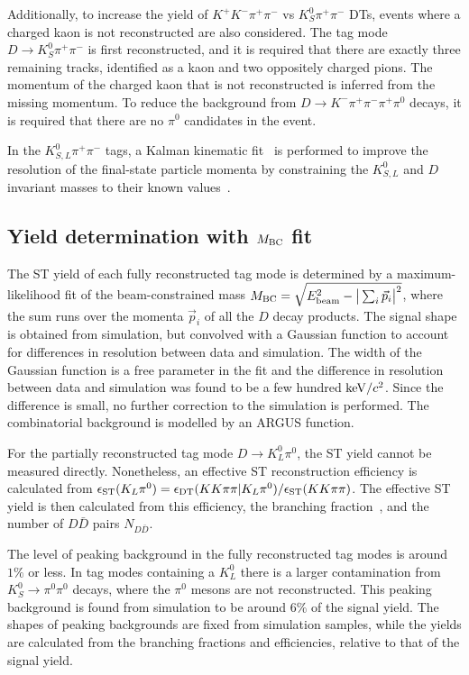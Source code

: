 \documentclass[12pt, a4paper, notitlepage, onecolumn]{article}
\begin{document}
Additionally, to increase the yield of $K^+K^-\pi^+\pi^-$ vs $K_S^0\pi^+\pi^-$ DTs, events where a charged kaon is not reconstructed are also considered. The tag mode $D\to K_S^0\pi^+\pi^-$ is first reconstructed, and it is required that there are exactly three remaining tracks, identified as a kaon and two oppositely charged pions. The momentum of the charged kaon that is not reconstructed is inferred from the missing momentum. To reduce the background from $D\to K^-\pi^+\pi^-\pi^+\pi^0$ decays, it is required that there are no $\pi^0$ candidates in the event.

In the $K_{S, L}^0\pi^+\pi^-$ tags, a Kalman kinematic fit~\cite{KalmanFit_cite} is performed to improve the resolution of the final-state particle momenta by constraining the $K_{S, L}^0$ and $D$ invariant masses to their known values~\cite{pdg}.

\subsection{Yield determination with \texorpdfstring{$M_{\rm BC}$}{MBC} fit}
\noindent The ST yield of each fully reconstructed tag mode is determined by a maximum-likelihood fit of the beam-constrained mass $M_{\rm BC} = \sqrt{E_{\rm beam}^2 - \big\lvert\sum_i\vec{p}_i\big\rvert^2}$, where the sum runs over the momenta $\vec{p}_i$ of all the $D$ decay products. The signal shape is obtained from simulation, but convolved with a Gaussian function to account for differences in resolution between data and simulation. The width of the Gaussian function is a free parameter in the fit and the difference in resolution between data and simulation was found to be a few hundred ${\rm keV}/c^2$. Since the difference is small, no further correction to the simulation is performed. The combinatorial background is modelled by an ARGUS function.

For the partially reconstructed tag mode $D\to K_L^0\pi^0$, the ST yield cannot be measured directly. Nonetheless, an effective ST reconstruction efficiency is calculated from $\epsilon_{\rm ST}(K_L\pi^0) = \epsilon_{\rm DT}(KK\pi\pi|K_L\pi^0)/\epsilon_{\rm ST}(KK\pi\pi)$. The effective ST yield is then calculated from this efficiency, the branching fraction~\cite{cite:deltaKpi}, and the number of $D\bar{D}$ pairs $N_{D\bar{D}}$.

The level of peaking background in the fully reconstructed tag modes is around $1\%$ or less. In tag modes containing a $K_L^0$ there is a larger contamination from $K_S^0\to\pi^0\pi^0$ decays, where the $\pi^0$ mesons are not reconstructed. This peaking background is found from simulation to be around $6\%$ of the signal yield. The shapes of peaking backgrounds are fixed from simulation samples, while the yields are calculated from the branching fractions and efficiencies, relative to that of the signal yield.
\end{document}
